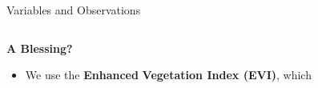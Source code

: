\documentclass[aspectratio=169,11pt,dvipsnames, handout]{beamer}
\begin{document}
\begin{frame}{Variables and Observations}
\label{frame:covars}
\vspace{-2.5em}
    \begin{columns}[t]
        \begin{column}{0.45\textwidth}
            \begin{tcolorbox}[colback=defaultclr!20, colframe=defaultclr!20, fontupper=\bfseries\color{defaultclr!40!black}, width=\textwidth, sharp corners, boxrule=0pt, halign=center]
                \textbf{A Blessing?}
            \end{tcolorbox}
            \vspace{-0.75em}
            \begin{itemize}
            \item We use the \colorbox{ForestGreen!30}{\bfseries \phantom{(}Enhanced\phantom{)}} \colorbox{ForestGreen!30}{\bfseries Vegetation Index (EVI)}, which


\end{itemize}
\end{column}
\end{columns}
\end{frame}
\end{document}
